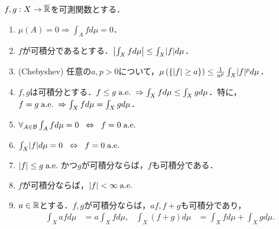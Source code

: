 \documentclass[uplatex, dvipdfmx]{jsreport}
\renewcommand{\B}{\mathcal{B}}
\begin{document}
\begin{theorem}\label{thm-properties-of-integral}
    $f,g:X\to\overline{\mathbb{R}}$を可測関数とする．
    \begin{enumerate}
        \item $\mu(A)=0\Rightarrow\int_Afd\mu=0$．
        \item $f$が可積分であるとする．$\left|\int_Xfd\mu\right|\le\int_X\lvert f\rvert d\mu$．
        \item (Chebyshev) 任意の$a,p>0$について，$\mu\left(\left\{\lvert f\rvert\ge a\right\}\right)\le\frac{1}{a^p}\int_X\lvert f\rvert^pd\mu$．
        \item $f,g$は可積分とする．$f\le g\;\mathrm{a.e.}\;\Rightarrow\int_X fd\mu\le\int_Xgd\mu$．特に，$f= g\;\mathrm{a.e.}\;\Rightarrow\int_X fd\mu=\int_Xgd\mu$．
        \item $\forall_{A\in\B}\int_Afd\mu=0\Lrarrow f=0\;\ae$
        \item $\int_X\lvert f\rvert d\mu=0\;\;\Leftrightarrow\;\; f=0\;\mathrm{a.e.}\;$
        \item $\lvert f\rvert\le g\;\mathrm{a.e.}\;$かつ$g$が可積分ならば，$f$も可積分である．
        \item $f$が可積分ならば，$\lvert f\rvert<\infty\;\mathrm{a.e.}\;$
        \item $a\in\mathbb{R}$とする．$f,g$が可積分ならば，$af,f+g$も可積分であり，
        \begin{align*}
            \int_Xafd\mu&=a\int_Xfd\mu,&\int_X(f+g)d\mu&=\int_Xfd\mu+\int_Xgd\mu.
        \end{align*}
    \end{enumerate}
\end{theorem}
\end{document}
